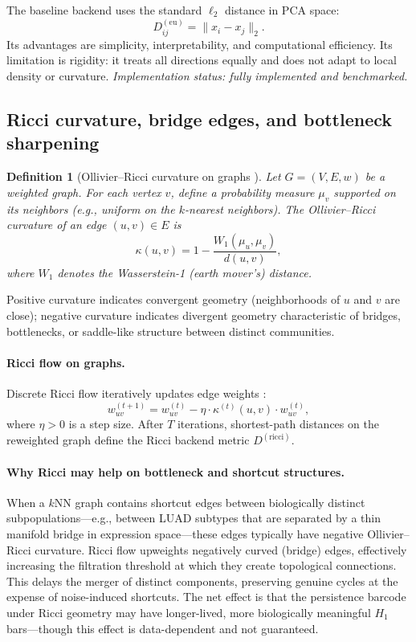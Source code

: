 \documentclass[11pt]{article}
\newtheorem{definition}[theorem]{Definition}
\begin{document}
The baseline backend uses the standard $\ell_2$ distance in PCA space:
\[
D^{(\text{eu})}_{ij} = \|x_i - x_j\|_2.
\]
Its advantages are simplicity, interpretability, and computational efficiency.
Its limitation is rigidity: it treats all directions equally and does not adapt to local density or curvature.
\emph{Implementation status: fully implemented and benchmarked.}

\subsection{Ricci curvature, bridge edges, and bottleneck sharpening}
\label{sec:ricci}

\begin{definition}[Ollivier--Ricci curvature on graphs \cite{ollivier2007,ollivier2009}]\label{def:ricci}
Let $G = (V, E, w)$ be a weighted graph.
For each vertex $v$, define a probability measure $\mu_v$ supported on its neighbors (e.g., uniform on the $k$-nearest neighbors).
The \emph{Ollivier--Ricci curvature} of an edge $(u,v) \in E$ is
\[
\kappa(u,v) = 1 - \frac{W_1(\mu_u, \mu_v)}{d(u,v)},
\]
where $W_1$ denotes the Wasserstein-1 (earth mover's) distance.
\end{definition}

Positive curvature indicates convergent geometry (neighborhoods of $u$ and $v$ are close); negative curvature indicates divergent geometry characteristic of bridges, bottlenecks, or saddle-like structure between distinct communities.

\paragraph{Ricci flow on graphs.}
Discrete Ricci flow iteratively updates edge weights \cite{ni2019community}:
\[
w_{uv}^{(t+1)} = w_{uv}^{(t)} - \eta \cdot \kappa^{(t)}(u,v) \cdot w_{uv}^{(t)},
\]
where $\eta > 0$ is a step size.
After $T$ iterations, shortest-path distances on the reweighted graph define the Ricci backend metric $D^{(\text{ricci})}$.

\paragraph{Why Ricci may help on bottleneck and shortcut structures.}
When a $k$NN graph contains shortcut edges between biologically distinct subpopulations---e.g., between LUAD subtypes that are separated by a thin manifold bridge in expression space---these edges typically have negative Ollivier--Ricci curvature.
Ricci flow upweights negatively curved (bridge) edges, effectively increasing the filtration threshold at which they create topological connections.
This delays the merger of distinct components, preserving genuine cycles at the expense of noise-induced shortcuts.
The net effect is that the persistence barcode under Ricci geometry may have longer-lived, more biologically meaningful $H_1$ bars---though this effect is data-dependent and not guaranteed.
\end{document}
